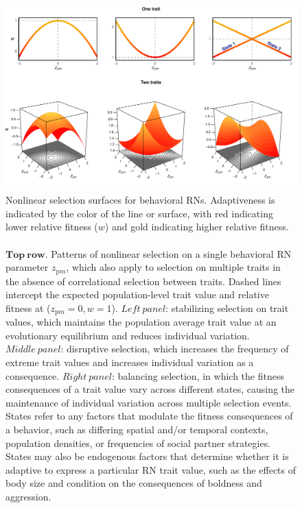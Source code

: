 \documentclass{article}
\begin{document}
\begin{figure}
\hspace*{-1.75cm}
\includegraphics[scale=0.7]{fig2.pdf}
\caption{Nonlinear selection surfaces for behavioral RNs. Adaptiveness is indicated by the color of the line or surface, with red indicating lower relative fitness ($w$) and gold indicating higher relative fitness. \\ \\
$\boldsymbol{Top \ row}$. Patterns of nonlinear selection on a single behavioral RN parameter ${z_{\mathrm{p}m}}$, which also apply to selection on multiple traits in the absence of correlational selection between traits. Dashed lines intercept the expected population-level trait value and relative fitness at (${z_{\mathrm{p}m}}=0, {w}=1$). $Left \ panel$: stabilizing selection on trait values, which maintains the population average trait value at an evolutionary equilibrium and reduces individual variation. $Middle \ panel$: disruptive selection, which increases the frequency of extreme trait values and increases individual variation as a consequence. $Right \ panel$: balancing selection, in which the fitness consequences of a trait value vary across different states, causing the maintenance of individual variation across multiple selection events. States refer to any factors that modulate the fitness consequences of a behavior, such as differing spatial and/or temporal contexts, population densities, or frequencies of social partner strategies. States may also be endogenous factors that determine whether it is adaptive to express a particular RN trait value, such as the effects of body size and condition on the consequences of boldness and aggression.  \\ \\
}
\end{figure}
\end{document}

